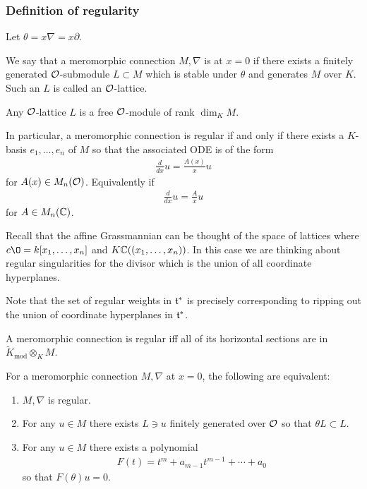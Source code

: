 \subsubsection{Definition of regularity}
Let $\theta = x\nabla = x\partial$.

\begin{definition}
	We say that a meromorphic connection $M,\nabla$ is  at $x=0$ if
	there exists a finitely generated ${\mathcal{O}}$-submodule $L\subset M$ which is stable under $\theta$
	and generates $M$ over $K$. Such an $L$ is called an ${\mathcal{O}}$-lattice.
\end{definition}

\begin{lemma}
	Any ${\mathcal{O}}$-lattice $L$ is a free ${\mathcal{O}}$-module of rank $\dim_K M$.
\end{lemma} In particular, a meromorphic connection is regular if
and only if there exists a $K$-basis $e_1,\dots,e_n$ of $M$ so that
the associated ODE is of the form \begin{align*}
	\frac{d}{dx}u = \frac{A(x)}{x}u
\end{align*} for $A(x)\in M_n({\mathcal{O}})$. Equivalently
if \begin{align*}
    \frac{d}{dx}u = \frac{A}{x}u
\end{align*} for $A\in M_n(\mathbb{C})$.

\begin{remark}
    Recall that the affine Grassmannian can be thought of 
    the space of lattices where $c\O = k[x_1,\dots,x_n]$ and 
    $K \mathbb{C}((x_1,\dots,x_n))$. In this case we are thinking about 
    regular singularities for the divisor which is the union of 
    all coordinate hyperplanes.

    \hfill

    Note that the set of regular weights in $\mathfrak{t}^*$
    is precisely corresponding to ripping out the union of coordinate
    hyperplanes in $\mathfrak{t}^*$.
\end{remark}

\begin{proposition}
	A meromorphic connection is regular iff all of its horizontal
	sections are in $\tilde K_{\text{mod}} \otimes_K M$.
\end{proposition}

\begin{proposition}
	For a meromorphic connection $M,\nabla$ at $x=0$, the following are equivalent:
	\begin{enumerate}
		\item $M,\nabla$ is regular.
		\item For any $u\in M$ there exists $L\ni u$ finitely generated over ${\mathcal{O}}$
		      so that $\theta L\subset L$.
		\item For any $u\in M$ there exists a polynomial \begin{align*}
			      F(t) = t^m + a_{m-1}t^{m-1} + \cdots + a_0
		      \end{align*} so that $F(\theta)u = 0$.
	\end{enumerate}
\end{proposition}

